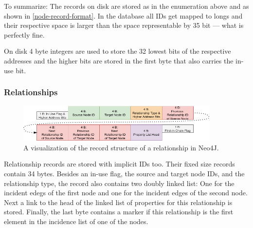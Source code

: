             To summarize: The records on disk are stored as in the enumeration above and as shown in \ref{node-record-format}. 
            In the database all IDs get mapped to longs and their respective space is larger than the space representable by 35 bit --- what is perfectly fine.
            
            On disk 4 byte integers are used to store the 32 lowest bits of the respective addresses and the higher bits are stored in the first byte that also carries the in-use bit.
        
        \subsubsection*{Relationships}\label{n4j-rel}
            \begin{figure}[htp]
                \begin{center}
                    \includegraphics[keepaspectratio,height=0.9\textheight,width=0.9\textwidth]{img/04-databases/relationship_record.png}
                \end{center}
                \caption{A visualization of the record structure of a relationship in Neo4J.}
                \label{rel_record}
            \end{figure}
                
            Relationship records are stored with implicit IDs too. 
            Their fixed size records contain 34 bytes.
            Besides an in-use flag, the source and target node IDs, and the relationship type, the record also contains two doubly linked list: 
            One for the incident edegs of the first node and one for the incident edges of the second node.
            Next a link to the head of the linked list of properties for this relationship is stored.
            Finally, the last byte contains a marker if this relationship is the first element in the incidence list of one of the nodes.
            
